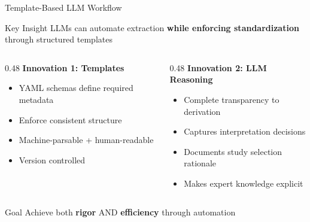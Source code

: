 \documentclass[10pt]{beamer}
\begin{document}
\begin{frame}{Template-Based LLM Workflow}

  \begin{block}{Key Insight}
    LLMs can automate extraction \textbf{while enforcing standardization} through structured templates
  \end{block}

  \vspace{0.3cm}

  \begin{columns}[T]
    \begin{column}{0.48\textwidth}
      \textbf{Innovation 1: Templates}
      \begin{itemize}
        \item YAML schemas define required metadata
        \item Enforce consistent structure
        \item Machine-parsable + human-readable
        \item Version controlled
      \end{itemize}
    \end{column}

    \begin{column}{0.48\textwidth}
      \textbf{Innovation 2: LLM Reasoning}
      \begin{itemize}
        \item Complete transparency to derivation
        \item Captures interpretation decisions
        \item Documents study selection rationale
        \item Makes expert knowledge explicit
      \end{itemize}
    \end{column}
  \end{columns}

  \vspace{0.3cm}

  \begin{exampleblock}{Goal}
    Achieve both \textcolor{successgreen}{\textbf{rigor}} AND \textcolor{successgreen}{\textbf{efficiency}} through automation
  \end{exampleblock}

\end{frame}
\end{document}
